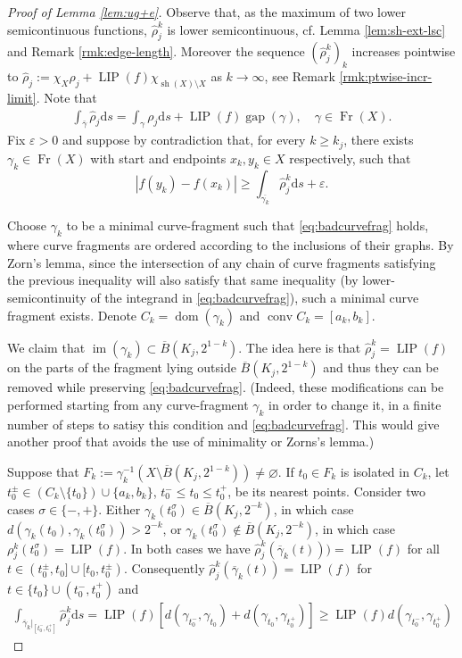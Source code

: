 \documentclass{amsart}
\numberwithin{equation}{section}
\newcommand{\LIP}{\operatorname{LIP}}
\newcommand{\im}{\operatorname{im}}
\newcommand{\gap}{\operatorname{gap}}
\newcommand{\dom}{\operatorname{dom}}
\newcommand{\Fr}{\operatorname{Fr}}
\newcommand{\conv}{\operatorname{conv}}
\newcommand{\sh}{\operatorname{sh}}
\newcommand{\ud}{\mathrm {d}}
\newcommand{\inv}{^{-1}}
\begin{document}
\begin{proof}[Proof of Lemma \ref{lem:ug+e}]
Observe that, as the maximum of two lower semicontinuous functions, $\widehat\rho_j^k$ is lower semicontinuous, cf. Lemma \ref{lem:sh-ext-lsc} and Remark \ref{rmk:edge-length}. Moreover the sequence $(\widehat\rho_j^k)_k$ increases pointwise to $\widehat\rho_j:=\chi_{X}\rho_j+\LIP(f)\chi_{\sh(X)\setminus X}$ as $k\to \infty$, see Remark \ref{rmk:ptwise-incr-limit}. Note that
\begin{align*}
\int_{\bar\gamma}\widehat \rho_j\ud s=\int_\gamma\rho_j\ud s+\LIP(f)\gap(\gamma),\quad \gamma\in\Fr(X).
\end{align*}
Fix $\varepsilon>0$ and suppose by contradiction that, for every $k\ge k_j$, there exists $\gamma_k\in\Fr(X)$ with start and endpoints $x_k,y_k\in X$ respectively, such that
\begin{equation}\label{eq:badcurvefrag}
   |f( y_k)-f( x_k)|\ge \int_{\overline{\gamma_k}}\widehat\rho_{j}^{k}\ud s+\varepsilon .
\end{equation}



Choose $\gamma_k$ to be a minimal curve-fragment such that \eqref{eq:badcurvefrag} holds, where curve fragments are ordered according to the inclusions of their graphs. By Zorn's lemma, since the intersection of any chain of curve fragments satisfying the previous inequality will also satisfy that same inequality (by lower-semicontinuity of the integrand in \eqref{eq:badcurvefrag}), such a minimal curve fragment exists. Denote $C_k=\dom(\gamma_k)$ and $\conv C_k=[a_k,b_k]$.

We claim that $\im(\gamma_k)\subset \overline B(K_j,2^{1-k})$. The idea here is that $\widehat\rho_j^k=\LIP(f)$ on the parts of the fragment lying outside $\overline B(K_j,2^{1-k})$ and thus they can be removed while preserving \eqref{eq:badcurvefrag}. (Indeed, these modifications can be performed starting from any curve-fragment $\gamma_k$ in order to change it, in a finite number of steps to satisy this condition and \eqref{eq:badcurvefrag}. This would give another proof that avoids the use of minimality or Zorns's lemma.)

Suppose that $F_k:=\gamma_k\inv(X\setminus \overline B(K_j,2^{1-k}))\ne \varnothing$. If $t_0\in F_k$ is isolated in $C_k$, let $t_0^\pm\in (C_k\setminus\{t_0\})\cup\{a_k,b_k\}$, $t_0^-\le t_0\le t_0^+$, be its nearest points. Consider two cases $\sigma \in \{-,+\}.$ Either $\gamma_k(t_0^\sigma)\in \overline B(K_j,2^{-k})$, in which case $d(\gamma_k(t_0),\gamma_k(t_0^\sigma))>2^{-k}$, or $\gamma_k(t_0^\sigma)\notin \overline B(K_j,2^{-k})$, in which case $\rho_j^k(t_0^\sigma)=\LIP(f)$. In both cases we have $\widehat \rho_j^k(\overline\gamma_k(t)))=\LIP(f)$ for all $t\in (t_0^\pm,t_0]\cup [t_0,t_0^\pm)$. Consequently $\widehat\rho_j^k(\overline\gamma_k(t))=\LIP(f)$ for $t\in \{t_0\}\cup(t_0^-,t_0^+)$ and 
\begin{align*}
\int_{\overline\gamma_k|_{[t_0^-,t_0^+]}}\widehat \rho_j^k\ud s=\LIP(f)[d(\gamma_{t_0^-},\gamma_{t_0})+d(\gamma_{t_0},\gamma_{t_0^+})]\ge \LIP(f)d(\gamma_{t_0^-},\gamma_{t_0^+})
\end{align*}


\end{proof}
\end{document}
